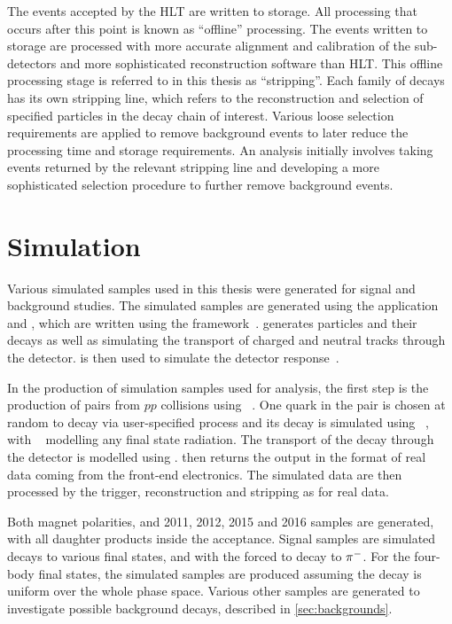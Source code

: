 The events accepted by the HLT are written to storage. All processing that occurs after this point is known as ``offline'' processing. The events written to storage are processed with more accurate alignment and calibration of the sub-detectors and more sophisticated reconstruction software than HLT. This offline processing stage is referred to in this thesis as ``stripping''. Each family of decays has its own stripping line, which refers to the reconstruction and selection of specified particles in the decay chain of interest. Various loose selection requirements are applied to remove background events to later reduce the processing time and storage requirements. An analysis initially involves taking events returned by the relevant stripping line and developing a more sophisticated selection procedure to further remove background events.

\section{Simulation}

Various simulated samples used in this thesis were generated for signal and background studies. The simulated samples are generated using the \lhcb application \gauss and \boole, which are written using the \gaudi framework~\cite{LHCb-PROC-2011-006,simulation}. \gauss generates particles and their decays as well as simulating the transport of charged and neutral tracks through the detector. \boole is then used to simulate the detector response~\cite{simulation}. 

In the production of simulation samples used for analysis, the first step is the production of \bquark\bquarkbar pairs from $pp$ collisions using ~\cite{Sjostrand:2007gs}. One quark in the \bquark\bquarkbar pair is chosen at random to decay via user-specified process and its decay is simulated using \evtgen~\cite{Lange:2001uf}, with \photos~\cite{Golonka:2005pn} modelling any final state radiation. The transport of the decay through the detector is modelled using \geant. \boole then returns the output in the format of real data coming from the front-end electronics. The simulated data are then processed by the trigger, reconstruction and stripping as for real data.

Both magnet polarities, and 2011, 2012, 2015 and 2016 samples are generated, with all daughter products inside the \lhcb acceptance. Signal samples are simulated \btodkst decays to various \D final states, and with the \Kstarm forced to decay to \KS${{\pi}^-}$. For the four-body \D final states, the simulated samples are produced assuming the \D decay is uniform over the whole phase space. Various other samples are generated to investigate possible background decays, described in \sect\ref{sec:backgrounds}.
